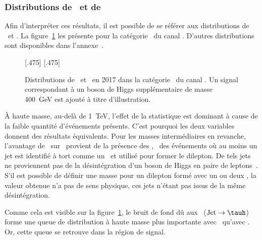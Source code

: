 \subsubsection{Distributions de \mml\ et de \mTtot}
Afin d'interpréter ces résultats, il est possible de se référer aux distributions de \mTtot\ et \mml.
La figure~\ref{fig-distributions_mml_mttot_2017_tt_btag} les présente pour la catégorie \CATbtag\ du canal \tauh\tauh.
D'autres distributions sont disponibles dans l'annexe~.
\begin{figure}[h]
\centering

[.475\textwidth]
{}
\hfill
{}[.475\textwidth]
{}

\caption[Distributions de \mTtot\ et \mml\ dans la catégorie \CATbtag\ du canal \tauh\tauh.]{Distributions de \mTtot\ et \mml\ en 2017 dans la catégorie \CATbtag\ du canal \tauh\tauh. Un signal correspondant à un boson de Higgs supplémentaire de masse \SI{400}{\GeV} est ajouté à titre d'illustration.
}
\label{fig-distributions_mml_mttot_2017_tt_btag}
\end{figure}
\par
À haute masse,
au-delà de \SI{1}{\TeV},
l'effet de la statistique est dominant
à cause de la faible quantité d'événements présents.
C'est pourquoi les deux variables donnent des résultats équivalents.
Pour les masses intermédiaires en revanche,
l'avantage de \mTtot\ sur \mml\ provient de la présence des \ftauhs,
\ie\ des événements où au moins un jet est identifié à tort comme un \tauh\ et utilisé pour former le dilepton.
De tels jets ne proviennent pas de la désintégration d'un boson de Higgs en paire de leptons~\tau.
S'il est possible de définir une masse pour un dilepton formé avec un ou deux \ftauh,
la valeur obtenue n'a pas de sens physique, ces jets n'étant pas issus de la même désintégration.
\par
Comme cela est visible sur la figure~\ref{fig-distributions_mml_mttot_2017_tt_btag},
le bruit de fond dû aux \ftauhs\ ($\text{Jet}\to\tauh$) forme une queue de distribution à haute masse plus importante avec \mml\ qu'avec \mTtot.
Or, cette queue se retrouve dans la région de signal.
